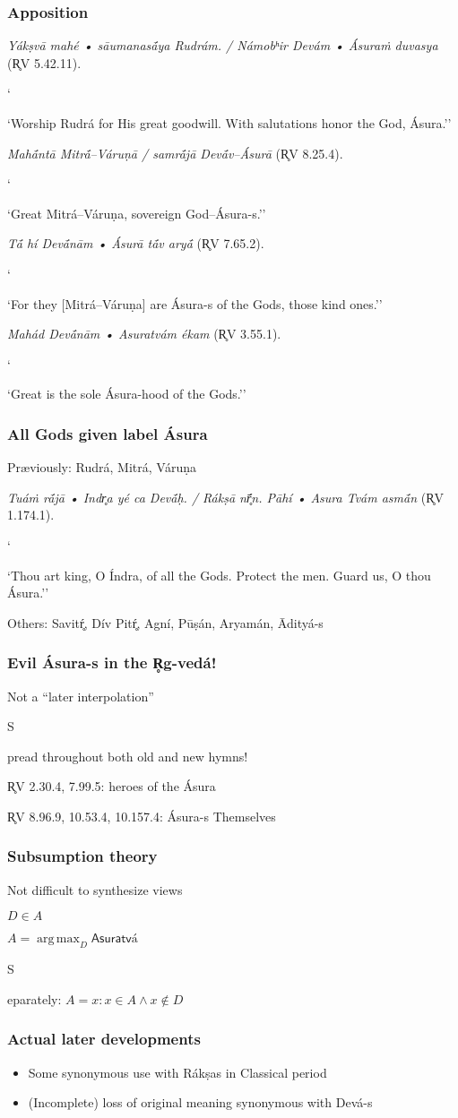 \documentclass[pdf]{beamer}
\newcommand{\Subitem}[1]{{\setlength\itemindent{12pt} \item[-] #1}}
\DeclareMathOperator*{\argmax}{arg\,max}
\begin{document}
\begin{frame} \frametitle{Apposition}
\begin{itemize}
	\item \textit{Yákṣvā mahé • sāumanasā́ya Rudrám. / Námobʰir Devám • Ásuraṁ duvasya} (R̥V 5.42.11).
	\Subitem ``Worship Rudrá for His great goodwill.  With salutations honor the God, Ásura.''
	\item \textit{Mahā́ntā Mitrā́--Váruṇā / samrā́jā Devā́v--Ásurā} (R̥V 8.25.4).
	\Subitem ``Great Mitrá--Váruṇa, sovereign God--Ásura-s.''
	\item \textit{Tā́ hí Devā́nām • Ásurā tā́v aryā́} (R̥V 7.65.2).
	\Subitem ``For they [Mitrá--Váruṇa] are Ásura-s of the Gods, those kind ones.''
	\item \textit{Mahád Devā́nām • Asuratvám ékam} (R̥V 3.55.1).
	\Subitem ``Great is the sole Ásura-hood of the Gods.''
\end{itemize}
\end{frame}

\begin{frame} \frametitle{All Gods given label Ásura}
\begin{itemize}
	\item Præviously: Rudrá, Mitrá, Váruṇa
	\item \textit{Tuáṁ rā́jā • Indr̥a yé ca Devā́ḥ. / Rákṣā nr̥̄́n.  Pāhí • Asura Tvám asmā́n} (R̥V 1.174.1).
	\Subitem ``Thou art king, O Índra, of all the Gods.  Protect the men.  Guard us, O thou Ásura.''
	\item Others: Savitŕ̥, Dív Pitŕ̥, Agní, Pūṣán, Aryamán, Ādityá-s
\end{itemize}
\end{frame}

\begin{frame} \frametitle{Evil Ásura-s in the R̥g-vedá!}
\begin{itemize}
	\item Not a ``later interpolation''
	\Subitem Spread throughout both old and new hymns!
	\item R̥V 2.30.4, 7.99.5: heroes of the Ásura
	\item R̥V 8.96.9, 10.53.4, 10.157.4: Ásura-s Themselves
\end{itemize}
\end{frame}

\begin{frame} \frametitle{Subsumption theory}
\begin{itemize}
	\item Not difficult to synthesize views
	\item $D \in A$
	\Subitem {$A = \argmax_{D} \mathsf{Asuratvá}$}
	\Subitem Separately: $A = x : x \in A \land x \notin D$
\end{itemize}
\end{frame}

\begin{frame} \frametitle{Actual later developments}
\begin{itemize}
	\item Some synonymous use with Rákṣas in Classical period
	\item (Incomplete) loss of original meaning synonymous with Devá-s
\end{itemize}
\end{frame}

\end{document}
